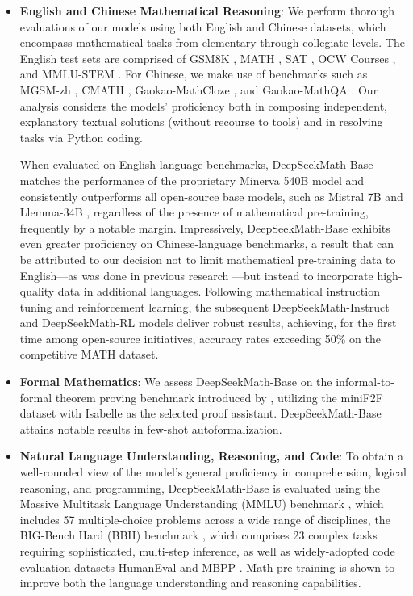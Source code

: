 \begin{itemize}[topsep=0pt]
    \item \textbf{English and Chinese Mathematical Reasoning}: We perform thorough evaluations of our models using both English and Chinese datasets, which encompass mathematical tasks from elementary through collegiate levels. The English test sets are comprised of GSM8K \citep{gsm8k}, MATH \citep{MATH}, SAT \citep{llemma}, OCW Courses \citep{minerva}, and MMLU-STEM \citep{mmlu}. For Chinese, we make use of benchmarks such as MGSM-zh \citep{mgsm}, CMATH \citep{wei2023cmath}, Gaokao-MathCloze \citep{agieval}, and Gaokao-MathQA \citep{agieval}. Our analysis considers the models' proficiency both in composing independent, explanatory textual solutions (without recourse to tools) and in resolving tasks via Python coding.

When evaluated on English-language benchmarks, DeepSeekMath-Base matches the performance of the proprietary Minerva 540B model \citep{minerva} and consistently outperforms all open-source base models, such as Mistral 7B \citep{mistral} and Llemma-34B \citep{llemma}, regardless of the presence of mathematical pre-training, frequently by a notable margin. Impressively, DeepSeekMath-Base exhibits even greater proficiency on Chinese-language benchmarks, a result that can be attributed to our decision not to limit mathematical pre-training data to English—as was done in previous research \citep{minerva,llemma}—but instead to incorporate high-quality data in additional languages. Following mathematical instruction tuning and reinforcement learning, the subsequent DeepSeekMath-Instruct and DeepSeekMath-RL models deliver robust results, achieving, for the first time among open-source initiatives, accuracy rates exceeding 50\% on the competitive MATH dataset.

\item \textbf{Formal Mathematics}: We assess DeepSeekMath-Base on the informal-to-formal theorem proving benchmark introduced by \citep{dsp_proof}, utilizing the miniF2F dataset \citep{minif2f} with Isabelle \citep{isabelle} as the selected proof assistant. DeepSeekMath-Base attains notable results in few-shot autoformalization.
\item \textbf{Natural Language Understanding, Reasoning, and Code}: To obtain a well-rounded view of the model’s general proficiency in comprehension, logical reasoning, and programming, DeepSeekMath-Base is evaluated using the Massive Multitask Language Understanding (MMLU) benchmark \citep{mmlu}, which includes 57 multiple-choice problems across a wide range of disciplines, the BIG-Bench Hard (BBH) benchmark \citep{bbh}, which comprises 23 complex tasks requiring sophisticated, multi-step inference, as well as widely-adopted code evaluation datasets HumanEval \citep{codex} and MBPP \citep{mbpp}. Math pre-training is shown to improve both the language understanding and reasoning capabilities.


\end{itemize}

